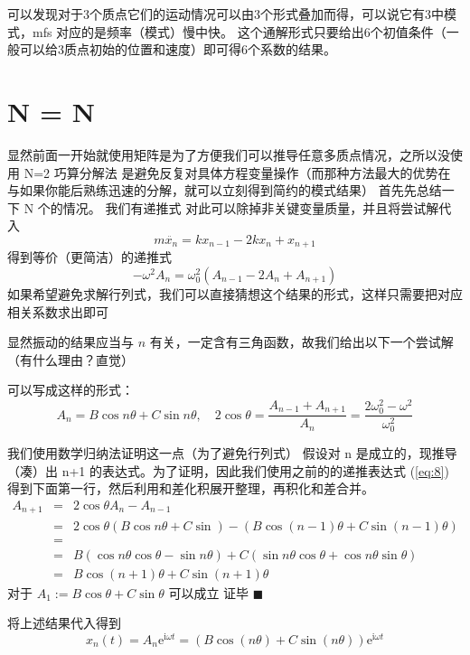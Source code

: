 \documentclass[11pt]{book}
\begin{document}
可以发现对于3个质点它们的运动情况可以由3个形式叠加而得，可以说它有3中模式，mfs 对应的是频率（模式）慢中快。
这个通解形式只要给出6个初值条件（一般可以给3质点初始的位置和速度）即可得6个系数的结果。

\section{N = N}
\label{sec:org833884c}
显然前面一开始就使用矩阵是为了方便我们可以推导任意多质点情况，之所以没使用 N=2 巧算分解法
是避免反复对具体方程变量操作（而那种方法最大的优势在与如果你能后熟练迅速的分解，就可以立刻得到简约的模式结果）
首先先总结一下 N 个的情况。
我们有递推式
对此可以除掉非关键变量质量，并且将尝试解代入
$$m\ddot{x_n}=kx_{n-1}-2kx_n+x_{n+1}$$
得到等价（更简洁）的递推式
\begin{equation}
\label{eq:8}
-\omega^{2}A_n=\omega_0^2(A_{n-1}-2A_n+A_{n+1})
\end{equation}
如果希望避免求解行列式，我们可以直接猜想这个结果的形式，这样只需要把对应相关系数求出即可

显然振动的结果应当与 \(n\) 有关，一定含有三角函数，故我们给出以下一个尝试解（有什么理由？直觉）
\begin{center}
可以写成这样的形式：
\begin{equation}
\label{eq:33}
A_n=B\cos n\theta +C\sin n\theta,\quad 2\cos \theta=\frac{A_{n-1}+A_{n+1}}{A_{n}}=\frac{2\omega_0^2-\omega^2}{\omega^2_0}
\end{equation}
\end{center}

我们使用数学归纳法证明这一点（为了避免行列式）
假设对 n 是成立的，现推导（凑）出 n+1 的表达式。为了证明，因此我们使用之前的的递推表达式 (\ref{eq:8}) 得到下面第一行，然后利用和差化积展开整理，再积化和差合并。
\begin{eqnarray}
\label{eq:17}
A_{n+1} & = & 2\cos\theta A_n-A_{n-1}\\
& = & 2\cos\theta(B\cos n\theta+C\sin)-(B\cos(n-1)\theta+C\sin(n-1)\theta)\\
&=&\\
&=&B(\cos n\theta\cos\theta-\sin n\theta)+C(\sin n\theta\cos\theta+\cos n\theta\sin\theta)\\
&=&B\cos(n+1)\theta +C\sin(n+1)\theta
\end{eqnarray}
对于 \(A_{1}:=B\cos\theta+C\sin\theta\) 可以成立
证毕 \(\blacksquare\)

将上述结果代入得到 $$x_n(t)=A_n\mathrm{e}^{\mathrm{i}\omega t}=(B\cos(n\theta) +C\sin(n\theta))\mathrm{e}^{\mathrm{i}\omega t}$$
\end{document}

